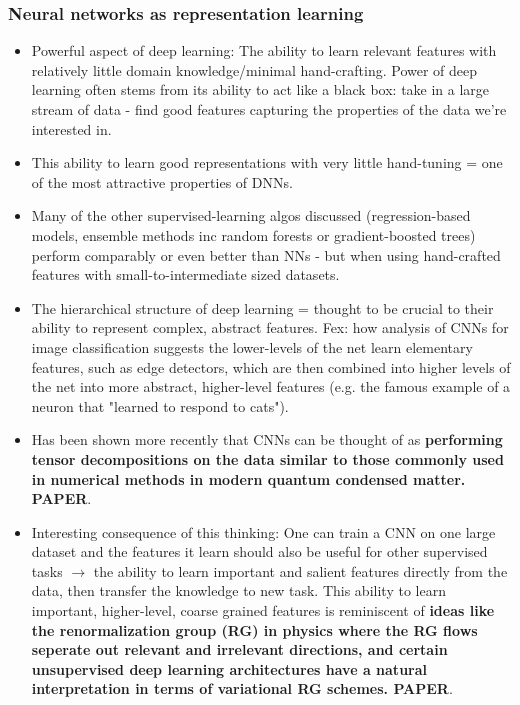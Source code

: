 \documentclass[norsk,a4paper,11pt]{article}
\begin{document}
\subsubsection{Neural networks as representation learning}
\begin{itemize}
	\item Powerful aspect of deep learning: The ability to learn relevant features with relatively little domain knowledge/minimal hand-crafting. Power of deep learning often stems from its ability to act like a black box: take in a large stream of data - find good features capturing the properties of the data we're interested in.
	\item This ability to learn good representations with very little hand-tuning = one of the most attractive properties of DNNs. 
	\item Many of the other supervised-learning algos discussed (regression-based models, ensemble methods inc random forests or gradient-boosted trees) perform comparably or even better than NNs - but when using hand-crafted features with small-to-intermediate sized datasets.
	\item The hierarchical structure of deep learning = thought to be crucial to their ability to represent complex, abstract features. Fex: how analysis of CNNs for image classification suggests the lower-levels of the net learn elementary features, such as edge detectors, which are then combined into higher levels of the net into more abstract, higher-level features (e.g. the famous example of a neuron that "learned to respond to cats"). 
	\item Has been shown more recently that CNNs can be thought of as \textbf{performing tensor decompositions on the data similar to those commonly used in numerical methods in modern quantum condensed matter. PAPER}.
	\item Interesting consequence of this thinking: One can train a CNN on one large dataset and the features it learn should also be useful for other supervised tasks $\rightarrow$ the ability to learn important and salient features directly from the data, then transfer the knowledge to new task. This ability to learn important, higher-level, coarse grained features is reminiscent of \textbf{ideas like the renormalization group (RG) in physics where the RG flows seperate out relevant and irrelevant directions, and certain unsupervised deep learning architectures have a natural interpretation in terms of variational RG schemes. PAPER}. 
\end{itemize}
\end{document}
